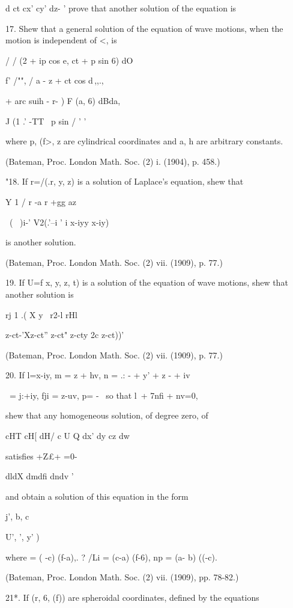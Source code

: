 d ct cx' cy' dz- ' prove that another solution of the equation is

17. Shew that a general solution of the equation of wave motions, when
the motion is independent of <, is

/ / (2 + ip cos e, ct + p sin 6) dO

f' /"", / a - z + ct cos d\,,,.,

+ arc suih - r- ) F (a, 6) dBda,

J (1 .' -TT \ p sin / ' '

where p, (f>, z are cylindrical coordinates and a, h are arbitrary
constants.

(Bateman, Proc. London Math. Soc. (2) i. (1904), p. 458.)

"18. If r=/(.r, y, z) is a solution of Laplace's equation, shew that

Y 1 / r -a r +gg az \

~( \, )i-' V2(.'--i ' i x-iyy x-iy)

is another solution.

(Bateman, Proc. London Math. Soc. (2) vii. (1909), p. 77.)

19. If U=f x, y, z, t) is a solution of the equation of wave motions,
shew that another solution is

rj 1 .( X y \ r2-l rHl \

z-ct-'Xz-ct'' z-ct" z-cty 2c z-ct))'

(Bateman, Proc. London Math. Soc. (2) vii. (1909), p. 77.)

20. If l=x-iy, m = z + hv, n = .: - + y' + z - + iv%

\ = j:+iy, fji = z-uv, p= - \, so that l\ + 7nfi + nv=0,

shew that any homogeneous solution, of degree zero, of

cHT cH[ dH/ c U Q dx' dy cz dw

satisfies +Z£+ =0-

dldX dmdfi dndv '

and obtain a solution of this equation in the form

j', b, c \

U', ', y' )

where = ( -c) (f-a),. ? /Li = (c-a) (f-6), np = (a- b) ((-c).

(Bateman, Proc. London Math. Soc. (2) vii. (1909), pp. 78-82.)

%
%

21*. If (r, 6, (f)) are spheroidal coordinates, defined by the
equations

